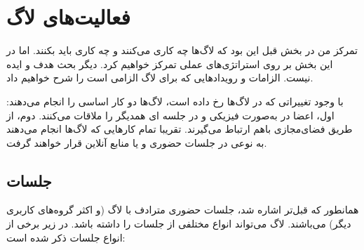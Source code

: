 \section{فعالیت‌های لاگ}

تمرکز من در بخش قبل این بود که لاگ‌ها چه کاری می‌کنند و چه کاری باید بکنند.
اما در این بخش بر روی استراتژی‌های عملی تمرکز خواهیم کرد. دیگر بحث هدف
و ایده نیست. الزامات و رویدادهایی که برای لاگ الزامی است را شرح خواهیم داد.

با وجود تغییراتی که در لاگ‌ها رخ داده است، لاگ‌ها دو کار اساسی را انجام می‌دهند:
اول، اعضا در به‌صورت فیزیکی و در جلسه ای همدیگر را ملاقات می‌کنند. دوم،
از طریق فضای‌مجازی باهم ارتباط می‌گیرند.
تقریبا تمام کارهایی که لاگ‌ها انجام می‌دهند به نوعی در جلسات حضوری و یا منابع آنلاین
قرار خواهند گرفت.

\subsection{جلسات}

همانطور که قبل‌تر اشاره شد، جلسات حضوری مترادف با لاگ
(و اکثر گروه‌های کاربری دیگر) می‌باشند. لاگ می‌تواند انواع مختلفی از جلسات را داشته باشد.
در زیر برخی از انواع جلسات ذکر شده است:

